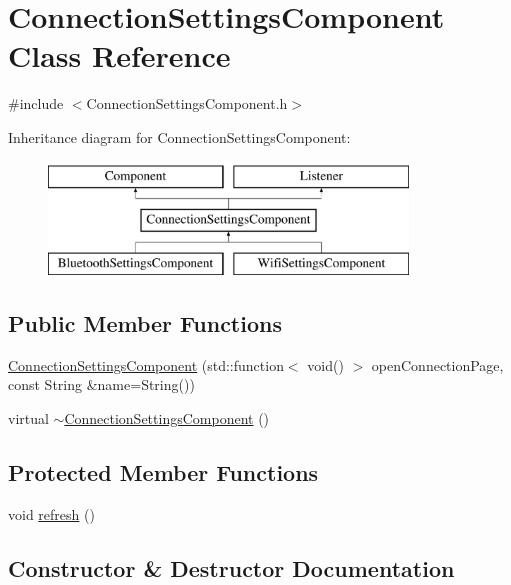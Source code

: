 \hypertarget{classConnectionSettingsComponent}{}\section{Connection\+Settings\+Component Class Reference}
\label{classConnectionSettingsComponent}


{\ttfamily \#include $<$Connection\+Settings\+Component.\+h$>$}

Inheritance diagram for Connection\+Settings\+Component\+:\begin{figure}[H]
\begin{center}
\leavevmode
\includegraphics[height=3.000000cm]{classConnectionSettingsComponent}
\end{center}
\end{figure}
\subsection*{Public Member Functions}
\begin{DoxyCompactItemize}
\item 
\mbox{\hyperlink{classConnectionSettingsComponent_a30bee957c0afbb697e24768bd3da4386}{Connection\+Settings\+Component}} (std\+::function$<$ void() $>$ open\+Connection\+Page, const String \&name=String())
\item 
virtual \mbox{\hyperlink{classConnectionSettingsComponent_a52003605df73cdfaeb28b4d3395cbf28}{$\sim$\+Connection\+Settings\+Component}} ()
\end{DoxyCompactItemize}
\subsection*{Protected Member Functions}
\begin{DoxyCompactItemize}
\item 
void \mbox{\hyperlink{classConnectionSettingsComponent_aef6ce832a9a3301f38049ce8c7811df9}{refresh}} ()
\end{DoxyCompactItemize}


\subsection{Constructor \& Destructor Documentation}
\mbox{\label{classConnectionSettingsComponent_a30bee957c0afbb697e24768bd3da4386}} 
